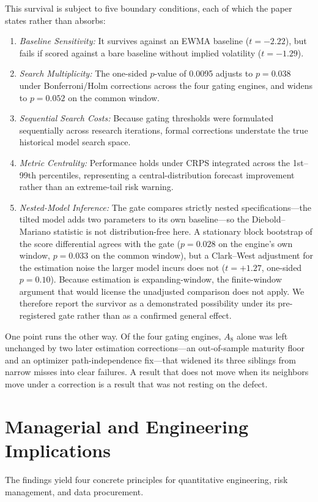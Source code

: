 \documentclass{ieeeaccess}
\begin{document}
This survival is subject to five boundary conditions, each of which the paper states rather than absorbs:
\begin{enumerate}
    \item \textit{Baseline Sensitivity:} It survives against an EWMA baseline ($t = -2.22$), but fails if scored against a bare baseline without implied volatility ($t = -1.29$).
    \item \textit{Search Multiplicity:} The one-sided $p$-value of 0.0095 adjusts to $p = 0.038$ under Bonferroni/Holm corrections across the four gating engines, and widens to $p = 0.052$ on the common window.
    \item \textit{Sequential Search Costs:} Because gating thresholds were formulated sequentially across research iterations, formal corrections understate the true historical model search space.
    \item \textit{Metric Centrality:} Performance holds under CRPS integrated across the 1st--99th percentiles, representing a central-distribution forecast improvement rather than an extreme-tail risk warning.
    \item \textit{Nested-Model Inference:} The gate compares strictly nested specifications---the tilted model adds two parameters to its own baseline---so the Diebold--Mariano statistic is not distribution-free here. A stationary block bootstrap of the score differential agrees with the gate ($p = 0.028$ on the engine's own window, $p = 0.033$ on the common window), but a Clark--West adjustment for the estimation noise the larger model incurs does not ($t = +1.27$, one-sided $p = 0.10$). Because estimation is expanding-window, the finite-window argument that would license the unadjusted comparison does not apply. We therefore report the survivor as a demonstrated possibility under its pre-registered gate rather than as a confirmed general effect.
\end{enumerate}

One point runs the other way. Of the four gating engines, $A_8$ alone was left unchanged by two later estimation corrections---an out-of-sample maturity floor and an optimizer path-independence fix---that widened its three siblings from narrow misses into clear failures. A result that does not move when its neighbors move under a correction is a result that was not resting on the defect.

\section{Managerial and Engineering Implications}
\label{sec:implications}
The findings yield four concrete principles for quantitative engineering, risk management, and data procurement.
\end{document}

